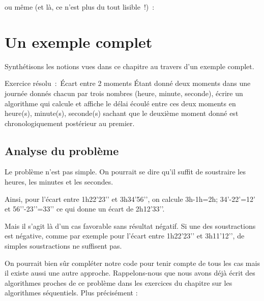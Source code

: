 	ou même (et là, ce n’est plus du tout lisible~!)~:


\section{Un exemple complet}

Synthétisons les notions vues dans ce chapitre au travers
d’un exemple complet.


\begin{Emphase}[exercice]{Exercice résolu~:~Écart entre 2 moments}
	Étant donné deux moments dans une journée donnés chacun par trois
	nombres (heure, minute, seconde), écrire un algorithme qui calcule et
	affiche le délai écoulé entre ces deux moments en heure(s), minute(s),
	seconde(s) sachant que le deuxième moment donné est chronologiquement
	postérieur au premier.
\end{Emphase}

\subsection*{Analyse du problème}

	Le problème n’est pas simple. 
	On pourrait se dire qu’il suffit de soustraire les heures, 
	les minutes et les secondes.

	Ainsi, pour l’écart entre
	1h22’23’’ et
	3h34’56’’, on
	calcule 3h-1h=2h;
	34’-22’=12’ et
	56’’-23’’=33’’
	ce qui donne un écart de
	2h12’33’’.

	Mais il s’agit là d’un cas favorable
	sans résultat négatif. Si une des soustractions est négative, comme par
	exemple pour l’écart entre
	1h22’23’’ et
	3h11’12’’, de
	simples soustractions ne suffisent pas.

	On pourrait bien sûr compléter notre code pour tenir compte de tous les
	cas mais il existe aussi une autre approche. Rappelons-nous que nous
	avons déjà écrit des algorithmes proches de ce problème dans les
	exercices du chapitre sur les algorithmes séquentiels. Plus précisément
	:


